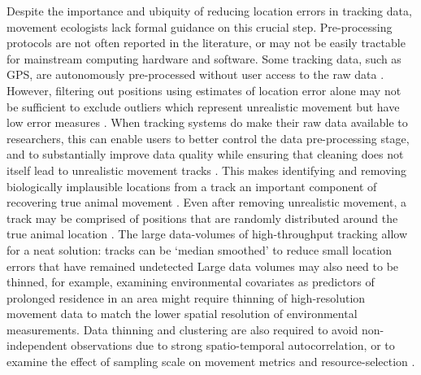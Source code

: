 \begin{refsection}
    Despite the importance and ubiquity of reducing location errors in tracking data, movement ecologists lack formal guidance on this crucial step.
    Pre-processing protocols are not often reported in the literature, or may not be easily tractable for mainstream computing hardware and software.
    Some tracking data, such as GPS, are autonomously pre-processed without user access to the raw data \cite[using error estimates and Kalman smooths;][and substantial location errors may yet persist]{kaplan2005}.
    However, filtering out positions using estimates of location error alone may not be sufficient to exclude outliers which represent unrealistic movement but have low error measures \cite{weiser2016, ranacher2016}.
    When tracking systems do make their raw data available to researchers, this can enable users to better control the data pre-processing stage, and to substantially improve data quality while ensuring that cleaning does not itself lead to unrealistic movement tracks \cite[e.g. Kalman smooths which distort tracks,][]{kaplan2005}.
    This makes identifying and removing biologically implausible locations from a track an important component of recovering true animal movement \cite{bjorneraas2010}.
    Even after removing unrealistic movement, a track may be comprised of positions that are randomly distributed around the true animal location \cite{noonan2019}.
    The large data-volumes of high-throughput tracking allow for a neat solution: tracks can be `median smoothed' to reduce small location errors that have remained undetected \cite[e.g.][]{bijleveld2016} 
    Large data volumes may also need to be thinned, for example, examining environmental covariates as predictors of prolonged residence in an area  \cite[see e.g.][]{bracis2018, aarts2008, bijleveld2016, oudman2018, harel2016} might require thinning of high-resolution movement data to match the lower spatial resolution of environmental measurements. 
    Data thinning and clustering are also required to avoid non-independent observations due to strong spatio-temporal autocorrelation, or to examine the effect of sampling scale on movement metrics and resource-selection \cite{fleming2014a,noonan2019}.


\end{refsection}
